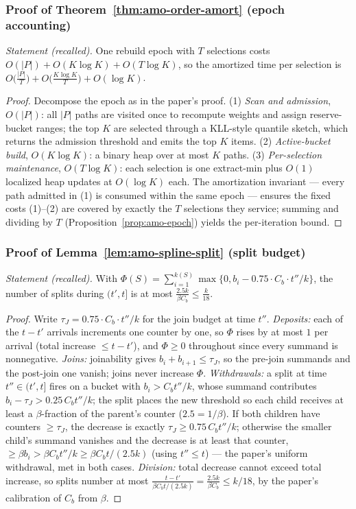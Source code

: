 \subsubsection*{Proof of Theorem~\ref{thm:amo-order-amort} (epoch accounting)}
{\itshape Statement (recalled).} One rebuild epoch with $T$ selections costs
$O(|P|) + O(K \log K) + O(T \log K)$, so the amortized time per selection is
$O\bigl(\tfrac{|P|}{T}\bigr) + O\bigl(\tfrac{K \log K}{T}\bigr) +
O(\log K)$.\eop

\begin{proof}
Decompose the epoch as in the paper's proof. (1) \emph{Scan and admission},
$O(|P|)$: all $|P|$ paths are visited once to recompute weights and assign
reserve-bucket ranges; the top $K$ are selected through a KLL-style
quantile sketch, which returns the admission threshold and emits the top
$K$ items. (2) \emph{Active-bucket build}, $O(K \log K)$: a binary heap
over at most $K$ paths. (3) \emph{Per-selection maintenance},
$O(T \log K)$: each selection is one extract-min plus $O(1)$ localized
heap updates at $O(\log K)$ each. The amortization invariant --- every
path admitted in (1) is consumed within the same epoch --- ensures the
fixed costs (1)--(2) are covered by exactly the $T$ selections they
service; summing and dividing by $T$ (Proposition~\ref{prop:amo-epoch})
yields the per-iteration bound.
\end{proof}

\subsubsection*{Proof of Lemma~\ref{lem:amo-spline-split} (split budget)}
{\itshape Statement (recalled).} With
$\Phi(S) = \sum_{i=1}^{k(S)} \max\{0, b_i - 0.75 \cdot C_b \cdot t''/k\}$,
the number of splits during $(t', t]$ is at most
$\tfrac{2.5 k}{\beta C_b} \le \tfrac{k}{18}$.\eop

\begin{proof}
Write $\tau_J = 0.75 \cdot C_b \cdot t''/k$ for the join budget at time
$t''$. \emph{Deposits:} each of the $t - t'$ arrivals increments one
counter by one, so $\Phi$ rises by at most $1$ per arrival (total increase
$\le t - t'$), and $\Phi \ge 0$ throughout since every summand is
nonnegative. \emph{Joins:} joinability gives $b_i + b_{i+1} \le \tau_J$,
so the pre-join summands and the post-join one vanish; joins never
increase $\Phi$. \emph{Withdrawals:} a split at time $t'' \in (t', t]$
fires on a bucket with $b_i > C_b t''/k$, whose summand contributes
$b_i - \tau_J > 0.25\,C_b t''/k$; the split places the new threshold so
each child receives at least a $\beta$-fraction of the parent's counter
($2.5 = 1/\beta$). If both children have counters $\ge \tau_J$, the
decrease is exactly $\tau_J \ge 0.75\,C_b t''/k$; otherwise the smaller
child's summand vanishes and the decrease is at least that counter,
$\ge \beta b_i > \beta C_b t''/k \ge \beta C_b t/(2.5k)$ (using
$t'' \le t$) --- the paper's uniform withdrawal, met in both cases.
\emph{Division:} total decrease cannot exceed total increase, so splits
number at most $\frac{t - t'}{\beta C_b t/(2.5k)} = \frac{2.5k}{\beta C_b}
\le k/18$, by the paper's calibration of $C_b$ from $\beta$.
\end{proof}

